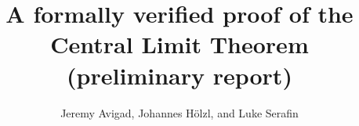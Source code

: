 \documentclass[usepdftitle=false]{beamer}
\title{A formally verified proof of the\\ Central Limit Theorem\\(preliminary report)}
\author{Jeremy Avigad, Johannes H\"olzl, and Luke Serafin}
\begin{document}
\begin{frame}
  \maketitle
\end{frame}
\end{document}
